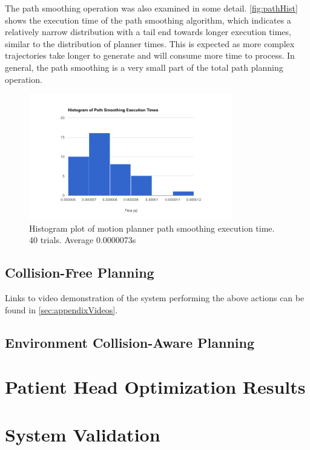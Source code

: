 \documentclass[12pt]{report}
\begin{document}
The path smoothing operation was also examined in some detail. \autoref{fig:pathHist} shows the execution time of the path smoothing algorithm, which indicates a relatively narrow distribution with a tail end towards longer execution times, similar to the distribution of planner times. This is expected as more complex trajectories take longer to generate and will consume more time to process. In general, the path smoothing is a very small part of the total path planning operation.

\begin{figure}[thpb]
	\centering
	\includegraphics[width = 3.5in]{graphs/smoother_hist.png}
    \caption{Histogram plot of motion planner path smoothing execution time. 40 trials. Average 0.0000073s}
    \label{fig:pathHist}
\end{figure}
\subsection{Collision-Free Planning}
Links to video demonstration of the system performing the above actions can be found in \autoref{sec:appendixVideos}.
\subsection{Environment Collision-Aware Planning}

\section{Patient Head Optimization Results}

\section{System Validation}


\end{document}
